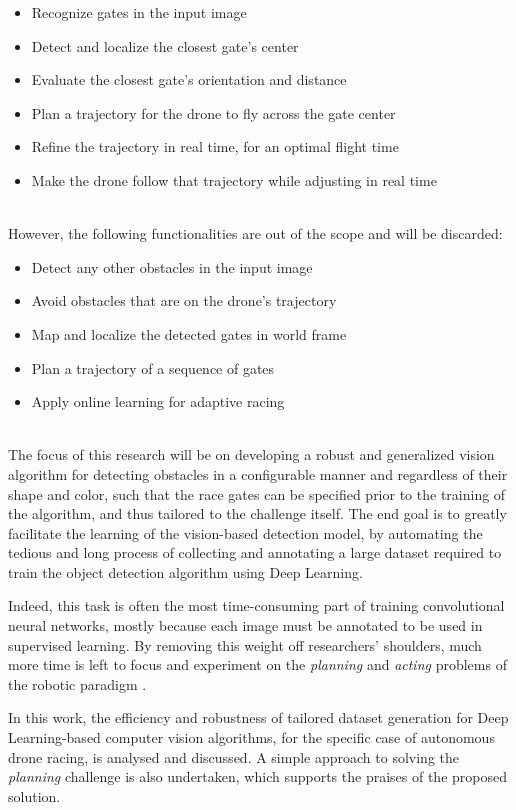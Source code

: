 \begin{itemize}
	\item{Recognize gates in the input image}
	\item{Detect and localize the closest gate's center}
	\item{Evaluate the closest gate's orientation and distance}
	\item{Plan a trajectory for the drone to fly across the gate center}
	\item{Refine the trajectory in real time, for an optimal flight time}
	\item{Make the drone follow that trajectory while adjusting in real time}
\end{itemize}
~\\
However, the following functionalities are out of the scope and will be
discarded:

\begin{itemize}
	\item{Detect any other obstacles in the input image}
	\item{Avoid obstacles that are on the drone's trajectory}
	\item{Map and localize the detected gates in world frame}
	\item{Plan a trajectory of a sequence of gates}
	\item{Apply online learning for adaptive racing}
\end{itemize}


~\\
The focus of this research will be on developing a robust and generalized
vision algorithm for detecting obstacles in a configurable manner and regardless
of their shape and color, such that the race gates can be specified prior to the
training of the algorithm, and thus tailored to the challenge itself. The end
goal is to greatly facilitate the learning of the vision-based detection model,
by automating the tedious and long process of collecting and annotating a large
dataset required to train the object detection algorithm using Deep Learning.

Indeed, this task is often the most time-consuming part of training
convolutional neural networks, mostly because each image must be annotated to be
used in supervised learning. By removing this weight off researchers' shoulders,
much more time is left to focus and experiment on the \emph{planning} and
\emph{acting} problems of the robotic paradigm .

In this work, the efficiency and robustness of tailored dataset generation for
Deep Learning-based computer vision algorithms, for the specific case of
autonomous drone racing, is analysed and discussed.
A simple approach to solving the \emph{planning} challenge is also undertaken,
which supports the praises of the proposed solution.
